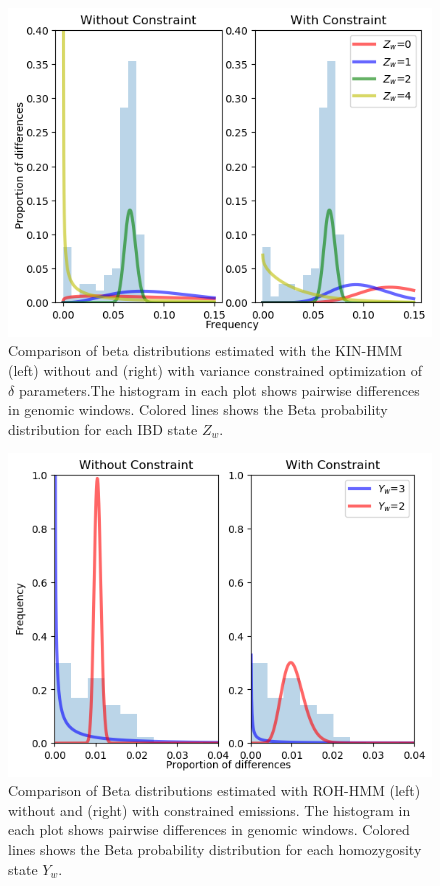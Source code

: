 \documentclass[12pt, letterpaper]{article}
\begin{document}
\begin{figure}[h!]
    \includegraphics[width=18cm]{supplementary_info/plots/contam0_inbred1_run57_coverage0.2_asc0_inputMode_hapProbs_fil0_pair0_15_relid_betaplot.png}
    \centering
    \caption{Comparison of beta distributions estimated with the KIN-HMM (left) without and (right) with variance constrained optimization of $\delta$ parameters.The histogram in each plot shows pairwise differences in genomic windows. Colored lines shows the Beta probability distribution for each IBD state $Z_w$.}
    \label{figS4:bndsbeta}
\end{figure}


\begin{figure}[h!]
    \includegraphics[width=18cm]{supplementary_info/plots/contam0_inbred1_run57_coverage0.2_asc0_inputMode_hapProbs_fil0_ind0_forced_roh.png}
     \centering
    \caption{Comparison of Beta distributions estimated with ROH-HMM (left) without and (right) with constrained emissions. The histogram in each plot shows pairwise differences in genomic windows. Colored lines shows the Beta probability distribution for each homozygosity state $Y_w$.}
    \label{figS5:ROHforced}
\end{figure}
\end{document}
